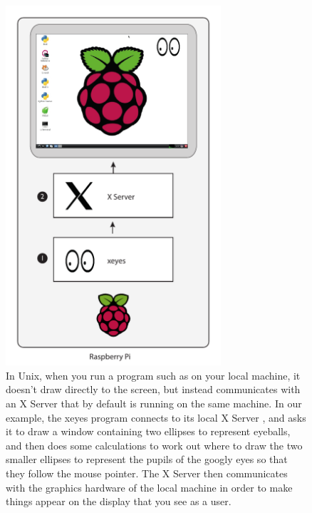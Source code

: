 \begin{figure}
\centerline{\includegraphics[width=8cm]{images/x-on-pi}}
\caption{In Unix, when you run a program such as  on your local machine, it doesn't draw directly to the screen, but instead communicates with an X Server that by default is running on the same machine. In our example, the xeyes program \protect{} connects to its local X Server \protect{}, and asks it to draw a window containing two ellipses to represent eyeballs, and then does some calculations to work out where to draw the two smaller ellipses to represent the pupils of the googly eyes so that they follow the mouse pointer. The X Server then communicates with the graphics hardware of the local machine in order to make things appear on the display that you see as a user. }\label{figure:x-on-pi}
\end{figure}

